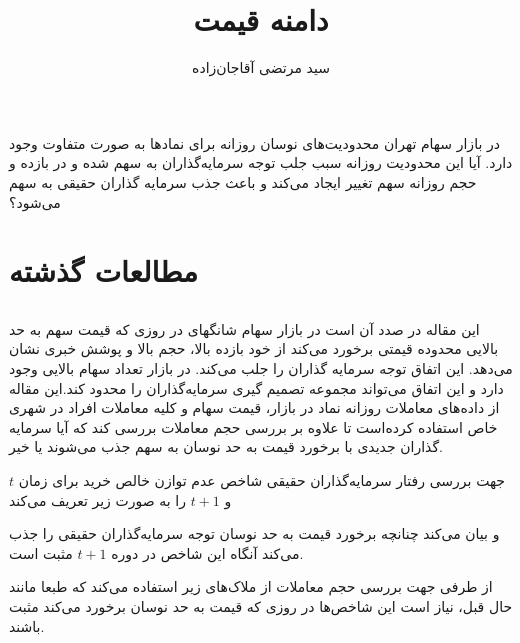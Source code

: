 \documentclass[12pt]{article}
\begin{document}
\title{دامنه قیمت}
\author{سید مرتضی آقاجان‌زاده}
\maketitle

در بازار سهام تهران محدودیت‌های نوسان روزانه برای نماد‌ها به صورت متفاوت وجود‌ دارد. آیا این محدودیت روزانه سبب جلب توجه سرمایه‌گذاران به سهم شده و در بازده و حجم روزانه سهم تغییر ایجاد می‌کند و باعث جذب سرمایه گذاران حقیقی به سهم می‌شود؟

\section{مطالعات گذشته}
\subsection{}
\label{s1.1}
این مقاله در صدد آن است در بازار سهام شانگهای در روزی که قیمت سهم به حد بالایی محدوده قیمتی برخورد می‌کند از خود بازده بالا، حجم بالا و پوشش خبری نشان می‌دهد. این اتفاق توجه سرمایه گذاران را جلب می‌کند. در بازار تعداد سهام بالایی وجود دارد و این اتفاق می‌تواند مجموعه تصمیم گیری سرمایه‌گذاران را محدود کند.این مقاله از داده‌های معاملات روزانه نماد در بازار، قیمت سهام و کلیه معاملات افراد در شهری خاص استفاده کرده‌است تا علاوه بر بررسی حجم معاملات بررسی کند که آیا سرمایه گذاران جدیدی با برخورد قیمت به حد نوسان به سهم جذب می‌شوند یا خیر.


جهت بررسی رفتار سرمایه‌گذاران حقیقی شاخص عدم توازن خالص خرید برای زمان $ t $ و $ t+1 $ را به صورت زیر تعریف می‌کند

و بیان می‌کند چنانچه برخورد قیمت به حد نوسان توجه سرمایه‌گذاران حقیقی را جذب می‌کند آنگاه این شاخص در دوره $ t+1 $ مثبت است.

از طرفی جهت بررسی حجم معاملات از ملاک‌های زیر استفاده می‌کند که طبعا مانند حال قبل، نیاز است این شاخص‌ها در روزی که قیمت به حد نوسان برخورد می‌کند مثبت باشند.

\end{document}
